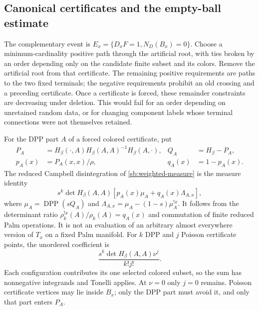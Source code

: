 \documentclass[11pt,a4paper]{article}
\theoremstyle{definition}
\theoremstyle{remark}
\numberwithin{equation}{section}
\begin{document}
\subsection{Canonical certificates and the empty-ball estimate}

The complementary event is
$E_x=\{D_xF=1, N_D(B_x)=0\}$. Choose a minimum-cardinality positive
path through the artificial root, with ties broken by an order
depending only on the candidate finite subset and its colors. Remove
the artificial root from that certificate. The remaining positive
requirements are paths to the two fixed terminals; the negative
requirements prohibit an old crossing and a preceding certificate.
Once a certificate is forced, these remainder constraints are
decreasing under deletion. This would fail for an order depending on
unretained random data, or for changing component labels whose terminal
connections were not themselves retained.

For the DPP part $A$ of a forced colored certificate, put
\begin{align*}
 P_A&=H_\beta(\cdot,A)H_\beta(A,A)^{-1}H_\beta(A,\cdot),
 &Q_A&=H_\beta-P_A,\\
 p_A(x)&=P_A(x,x)/\rho,
 &q_A(x)&=1-p_A(x).
\end{align*}
The reduced Campbell disintegration of \eqref{sb:weighted-measure}
is the measure identity
\begin{equation}
 s^k\det H_\beta(A,A)
 \left[p_A(x)\mu_A+q_A(x)\Lambda_{A,x}\right],
 \label{sb:campbell}
\end{equation}
where $\mu_A=\operatorname{DPP}(sQ_A)$ and
$\Lambda_{A,x}=\mu_A-(1-s)\mu_A^{!x}$. It follows from the determinant
ratio
$\rho_k^{!x}(A)/\rho_k(A)=q_A(x)$ and commutation of finite reduced
Palm operations. It is not an evaluation of an arbitrary almost
everywhere version of $T_x$ on a fixed Palm manifold. For $k$ DPP and
$j$ Poisson certificate points, the unordered coefficient is
\[
 \frac{s^k\det H_\beta(A,A)\nu^j}{k!j!}.
\]
Each configuration contributes its one selected colored subset, so the
sum has nonnegative integrands and Tonelli applies. At $\nu=0$ only
$j=0$ remains. Poisson certificate vertices may lie inside $B_x$; only
the DPP part must avoid it, and only that part enters $P_A$.
\end{document}
